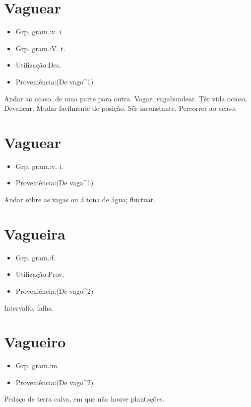 \documentclass{article}
\begin{document}
\section{Vaguear}
\begin{itemize}
\item {Grp. gram.:v. i}
\end{itemize}
\begin{itemize}
\item {Grp. gram.:V. t.}
\end{itemize}
\begin{itemize}
\item {Utilização:Des.}
\end{itemize}
\begin{itemize}
\item {Proveniência:(De \textunderscore vago\textunderscore ^1)}
\end{itemize}
Andar ao acaso, de uma parte para outra.
Vagar; vagabundear.
Têr vida ociosa.
Devanear.
Mudar facilmente de posição.
Sêr inconstante.
Percorrer ao acaso.
\section{Vaguear}
\begin{itemize}
\item {Grp. gram.:v. i.}
\end{itemize}
\begin{itemize}
\item {Proveniência:(De \textunderscore vaga\textunderscore ^1)}
\end{itemize}
Andar sôbre as vagas ou á tona de água; fluctuar.
\section{Vagueira}
\begin{itemize}
\item {Grp. gram.:f.}
\end{itemize}
\begin{itemize}
\item {Utilização:Prov.}
\end{itemize}
\begin{itemize}
\item {Proveniência:(De \textunderscore vago\textunderscore ^2)}
\end{itemize}
Intervallo, falha.
\section{Vagueiro}
\begin{itemize}
\item {Grp. gram.:m.}
\end{itemize}
\begin{itemize}
\item {Proveniência:(De \textunderscore vago\textunderscore ^2)}
\end{itemize}
Pedaço de terra calva, em que não houve plantações.
\end{document}
